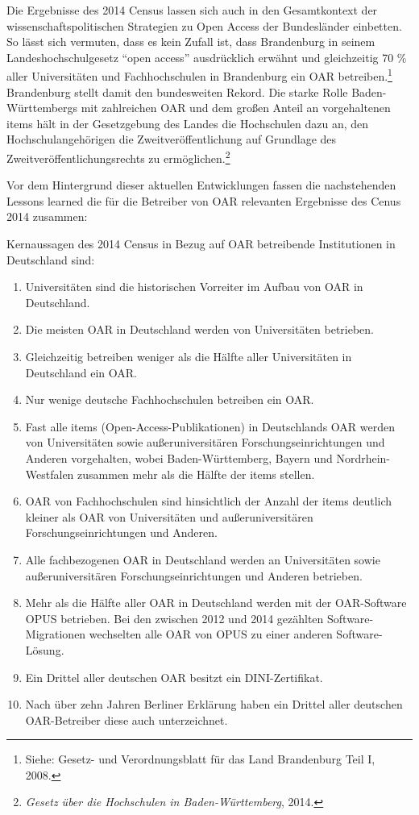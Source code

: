 \documentclass[a4paper,
fontsize=11pt,
oneside,
numbers=noperiodatend,
parskip=half-,
bibliography=totoc,
final
]{scrartcl}
\begin{document}
Die Ergebnisse des 2014 Census lassen sich auch in den Gesamtkontext der
wissenschaftspolitischen Strategien zu Open Access der Bundesländer
einbetten. So lässt sich vermuten, dass es kein Zufall ist, dass
Brandenburg in seinem Landeshochschulgesetz \enquote{open access}
ausdrücklich erwähnt und gleichzeitig 70 \% aller Universitäten und
Fachhochschulen in Brandenburg ein OAR betreiben.\footnote{Siehe:
  Gesetz- und Verordnungsblatt für das Land Brandenburg Teil I, 2008.}
Brandenburg stellt damit den bundesweiten Rekord. Die starke Rolle
Baden-Württembergs mit zahlreichen OAR und dem großen Anteil an
vorgehaltenen items hält in der Gesetzgebung des Landes die Hochschulen
dazu an, den Hochschulangehörigen die Zweitveröffentlichung auf
Grundlage des Zweitveröffentlichungsrechts zu ermöglichen.\footnote{\emph{Gesetz
  über die Hochschulen in Baden-Württemberg}, 2014.}

Vor dem Hintergrund dieser aktuellen Entwicklungen fassen die
nachstehenden Lessons learned die für die Betreiber von OAR relevanten
Ergebnisse des Cenus 2014 zusammen:

Kernaussagen des 2014 Census in Bezug auf OAR betreibende Institutionen
in Deutschland sind:

\begin{enumerate}
\def\labelenumi{\arabic{enumi}.}
\item
  Universitäten sind die historischen Vorreiter im Aufbau von OAR in
  Deutschland.
\item
  Die meisten OAR in Deutschland werden von Universitäten betrieben.
\item
  Gleichzeitig betreiben weniger als die Hälfte aller Universitäten in
  Deutschland ein OAR.
\item
  Nur wenige deutsche Fachhochschulen betreiben ein OAR.
\item
  Fast alle items (Open-Access-Publikationen) in Deutschlands OAR werden
  von Universitäten sowie außeruniversitären Forschungseinrichtungen und
  Anderen vorgehalten, wobei Baden-Württemberg, Bayern und
  Nordrhein-Westfalen zusammen mehr als die Hälfte der items stellen.
\item
  OAR von Fachhochschulen sind hinsichtlich der Anzahl der items
  deutlich kleiner als OAR von Universitäten und außeruniversitären
  Forschungseinrichtungen und Anderen.
\item
  Alle fachbezogenen OAR in Deutschland werden an Universitäten sowie
  außeruniversitären Forschungseinrichtungen und Anderen betrieben.
\item
  Mehr als die Hälfte aller OAR in Deutschland werden mit der
  OAR-Software OPUS betrieben. Bei den zwischen 2012 und 2014 gezählten
  Software-Migrationen wechselten alle OAR von OPUS zu einer anderen
  Software-Lösung.
\item
  Ein Drittel aller deutschen OAR besitzt ein DINI-Zertifikat.
\item
  Nach über zehn Jahren Berliner Erklärung haben ein Drittel aller
  deutschen OAR-Betreiber diese auch unterzeichnet.
\end{enumerate}
\end{document}
